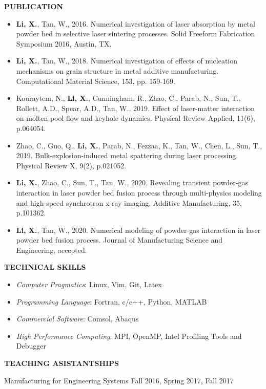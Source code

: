 \documentclass[12pt, letterpaper]{article}
\begin{document}
\vspace{3pt}


\vspace{-3pt}
\paraspace

\textbf{PUBLICATION}

\fullrule

\begin{itemize}[leftmargin=*, labelsep=4mm]
   \item \textbf{Li, X.}, Tan, W., 2016. Numerical investigation of laser absorption by metal powder
      bed in selective laser sintering processes. Solid Freeform Fabrication Symposium 2016, Austin,
      TX.
   \item \textbf{Li, X.}, Tan, W., 2018. Numerical investigation of effects of nucleation mechanisms
      on grain structure in metal additive manufacturing. Computational Material Science, 153, pp.
      159-169.
   \item Kouraytem, N., \textbf{Li, X.}, Cunningham, R., Zhao, C., Parab, N., Sun, T., Rollett,
      A.D., Spear, A.D., Tan, W., 2019. Effect of laser-matter interaction on molten pool flow and
      keyhole dynamics. Physical Review Applied, 11(6), p.064054.
   \item Zhao, C., Guo, Q., \textbf{Li, X.}, Parab, N., Fezzaa, K., Tan, W., Chen, L., Sun, T.,
      2019. Bulk-explosion-induced metal spattering during laser processing. Physical Review X,
      9(2), p.021052.
   \item \textbf{Li, X.}, Zhao, C., Sun, T., Tan, W., 2020. Revealing transient powder-gas
      interaction in laser powder bed fusion process through multi-physics modeling and high-speed
      synchrotron x-ray imaging. Additive Manufacturing, 35, p.101362. 
   \item \textbf{Li, X.}, Tan, W., 2020. Numerical modeling of powder-gas interaction in laser
      powder bed fusion process. Journal of Manufacturing Science and Engineering, accepted.
\end{itemize}
\vspace{-3pt}
\paraspace

\textbf{TECHNICAL SKILLS}

\fullrule

\begin{itemize}[leftmargin=*, labelsep=3mm, itemsep=2pt, topsep=0pt]
   \item \textit{Computer Pragmatics}: Linux, Vim, Git, Latex
   \item \textit{Programming Language}: Fortran, c/c++, Python, MATLAB
   \item \textit{Commercial Software}: Comsol, Abaqus
   \item \textit{High Performance Computing}: MPI, OpenMP, Intel Profiling Tools and Debugger
\end{itemize}

\paraspace
\textbf{TEACHING ASISTANTSHIPS}

\fullrule
Manufacturing for Engineering Systems \hfill Fall 2016, Spring 2017, Fall 2017
\end{document}
